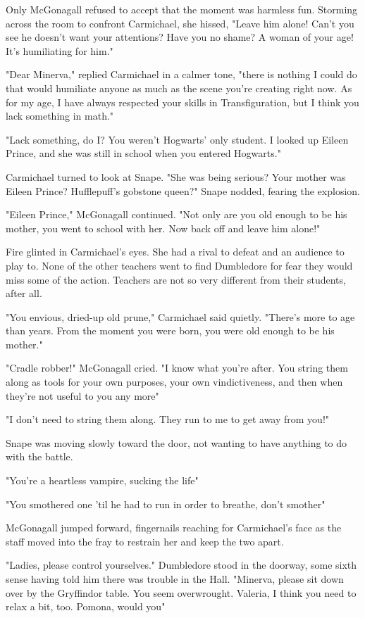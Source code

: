 Only McGonagall refused to accept that the moment was harmless fun. Storming across the room to confront Carmichael, she hissed, "Leave him alone! Can't you see he doesn't want your attentions? Have you no shame? A woman of your age! It's humiliating for him."

"Dear Minerva," replied Carmichael in a calmer tone, "there is nothing I could do that would humiliate anyone as much as the scene you're creating right now. As for my age, I have always respected your skills in Transfiguration, but I think you lack something in math."

"Lack something, do I? You weren't Hogwarts' only student. I looked up Eileen Prince, and she was still in school when you entered Hogwarts."

Carmichael turned to look at Snape. "She was being serious? Your mother was Eileen Prince? Hufflepuff's gobstone queen?" Snape nodded, fearing the explosion.

"Eileen Prince," McGonagall continued. "Not only are you old enough to be his mother, you went to school with her. Now back off and leave him alone!"

Fire glinted in Carmichael's eyes. She had a rival to defeat and an audience to play to. None of the other teachers went to find Dumbledore for fear they would miss some of the action. Teachers are not so very different from their students, after all.

"You envious, dried-up old prune," Carmichael said quietly. "There's more to age than years. From the moment you were born, you were old enough to be his mother."

"Cradle robber!" McGonagall cried. "I know what you're after. You string them along as tools for your own purposes, your own vindictiveness, and then when they're not useful to you any more{\el}"

"I don't need to string them along. They run to me to get away from you!"

Snape was moving slowly toward the door, not wanting to have anything to do with the battle.

"You're a heartless vampire, sucking the life{\el}"

"You smothered one 'til he had to run in order to breathe, don't smother{\el}"

McGonagall jumped forward, fingernails reaching for Carmichael's face as the staff moved into the fray to restrain her and keep the two apart.

"Ladies, please control yourselves." Dumbledore stood in the doorway, some sixth sense having told him there was trouble in the Hall. "Minerva, please sit down over by the Gryffindor table. You seem overwrought. Valeria, I think you need to relax a bit, too. Pomona, would you{\el}"

